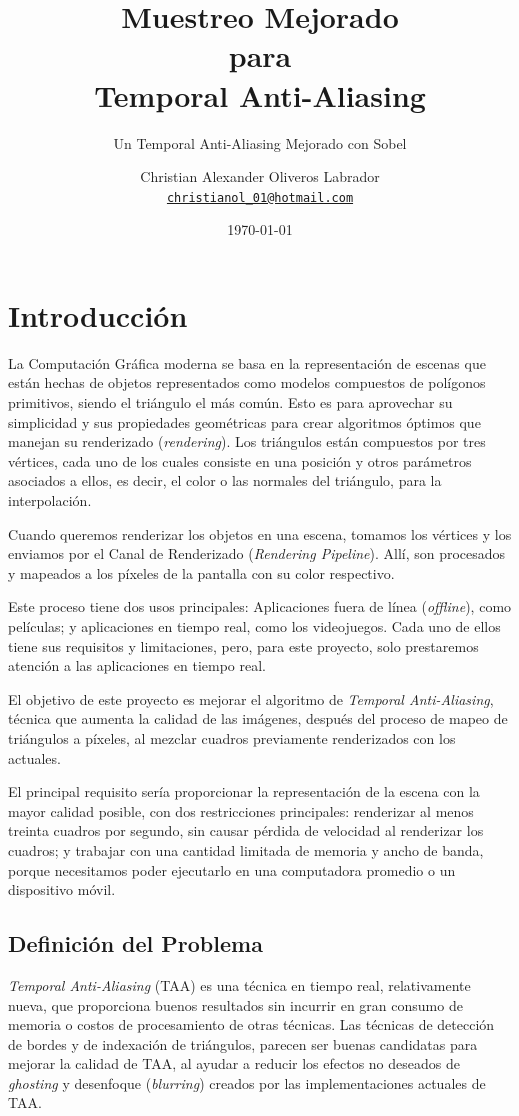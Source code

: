 \documentclass{cslthse-msc}
\author{
	Christian Alexander Oliveros Labrador \\
	{\normalsize \href{mailto:christianol_01@hotmail.com}{\texttt{christianol\_01@hotmail.com}}}
}
\title{Muestreo Mejorado\\para \\Temporal Anti-Aliasing}
\subtitle{Un Temporal Anti-Aliasing Mejorado con Sobel}
\date{\today}
\begin{document}
\makefrontmatter
\chapter[Introducción]{Introducción}
La Computación Gráfica moderna se basa en la representación de escenas que están hechas de objetos representados como modelos compuestos de polígonos primitivos, siendo el triángulo el más común. Esto es para aprovechar su simplicidad y sus propiedades geométricas para crear algoritmos óptimos que manejan su renderizado  (\textit{rendering}). Los triángulos están compuestos por tres vértices, cada uno de los cuales consiste en una posición y otros parámetros asociados a ellos, es decir, el color o las normales del triángulo, para la interpolación.

Cuando queremos renderizar los objetos en una escena, tomamos los vértices y los enviamos por el Canal de Renderizado (\textit{Rendering Pipeline}). Allí, son procesados y mapeados a los píxeles de la pantalla con su color respectivo.

Este proceso tiene dos usos principales: Aplicaciones fuera de línea (\textit{offline}), como películas; y aplicaciones en tiempo real, como los videojuegos. Cada uno de ellos tiene sus requisitos y limitaciones, pero, para este proyecto, solo prestaremos atención a las aplicaciones en tiempo real.

El objetivo de este proyecto es mejorar el algoritmo de \textit{Temporal Anti-Aliasing}, técnica que aumenta la calidad de las imágenes, después del proceso de mapeo de triángulos a píxeles, al mezclar cuadros previamente renderizados con los actuales.

El principal requisito sería proporcionar la representación de la escena con la mayor calidad posible, con dos restricciones principales: renderizar al menos treinta cuadros por segundo, sin causar pérdida de velocidad al renderizar los cuadros; y trabajar con una cantidad limitada de memoria y ancho de banda, porque necesitamos poder ejecutarlo en una computadora promedio o un dispositivo móvil. \cite{Doggett2017EDAN35, Shreiner2011}


\section{Definición del Problema}
\textit{Temporal Anti-Aliasing} (TAA) es una técnica en tiempo real, relativamente nueva, que proporciona buenos resultados sin incurrir en gran consumo de memoria o costos de procesamiento de otras técnicas. Las técnicas de detección de bordes y de indexación de triángulos, parecen ser buenas candidatas para mejorar la calidad de TAA, al ayudar a reducir los efectos no deseados de \textit{ghosting} y desenfoque  (\textit{blurring}) creados por las implementaciones actuales de TAA.
\end{document}
